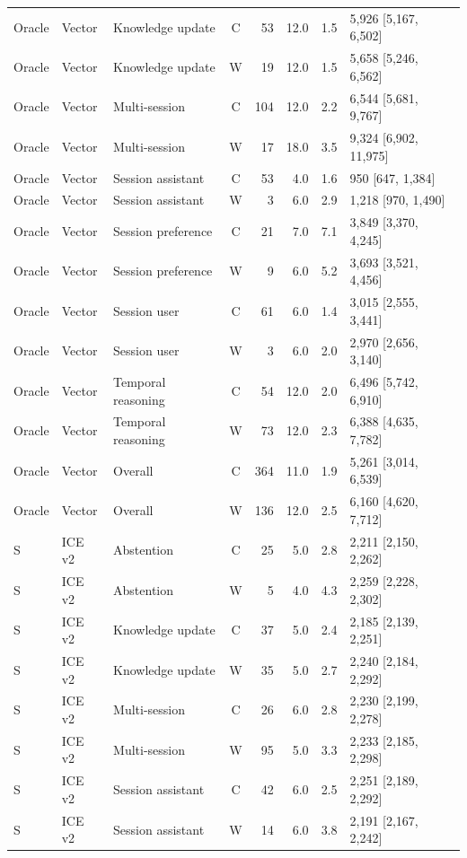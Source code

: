 \documentclass[11pt,a4paper]{article}
\begin{document}
\begin{longtable}{@{}L{1.0cm}L{1.0cm}L{2.6cm}crrrL{3.6cm}@{}}
Oracle & Vector & Knowledge update & C & 53 & 12.0 & 1.5 & 5,926 [5,167, 6,502] \\
Oracle & Vector & Knowledge update & W & 19 & 12.0 & 1.5 & 5,658 [5,246, 6,562] \\
Oracle & Vector & Multi-session & C & 104 & 12.0 & 2.2 & 6,544 [5,681, 9,767] \\
Oracle & Vector & Multi-session & W & 17 & 18.0 & 3.5 & 9,324 [6,902, 11,975] \\
Oracle & Vector & Session assistant & C & 53 & 4.0 & 1.6 & 950 [647, 1,384] \\
Oracle & Vector & Session assistant & W & 3 & 6.0 & 2.9 & 1,218 [970, 1,490] \\
Oracle & Vector & Session preference & C & 21 & 7.0 & 7.1 & 3,849 [3,370, 4,245] \\
Oracle & Vector & Session preference & W & 9 & 6.0 & 5.2 & 3,693 [3,521, 4,456] \\
Oracle & Vector & Session user & C & 61 & 6.0 & 1.4 & 3,015 [2,555, 3,441] \\
Oracle & Vector & Session user & W & 3 & 6.0 & 2.0 & 2,970 [2,656, 3,140] \\
Oracle & Vector & Temporal reasoning & C & 54 & 12.0 & 2.0 & 6,496 [5,742, 6,910] \\
Oracle & Vector & Temporal reasoning & W & 73 & 12.0 & 2.3 & 6,388 [4,635, 7,782] \\
Oracle & Vector & Overall & C & 364 & 11.0 & 1.9 & 5,261 [3,014, 6,539] \\
Oracle & Vector & Overall & W & 136 & 12.0 & 2.5 & 6,160 [4,620, 7,712] \\
S & ICE v2 & Abstention & C & 25 & 5.0 & 2.8 & 2,211 [2,150, 2,262] \\
S & ICE v2 & Abstention & W & 5 & 4.0 & 4.3 & 2,259 [2,228, 2,302] \\
S & ICE v2 & Knowledge update & C & 37 & 5.0 & 2.4 & 2,185 [2,139, 2,251] \\
S & ICE v2 & Knowledge update & W & 35 & 5.0 & 2.7 & 2,240 [2,184, 2,292] \\
S & ICE v2 & Multi-session & C & 26 & 6.0 & 2.8 & 2,230 [2,199, 2,278] \\
S & ICE v2 & Multi-session & W & 95 & 5.0 & 3.3 & 2,233 [2,185, 2,298] \\
S & ICE v2 & Session assistant & C & 42 & 6.0 & 2.5 & 2,251 [2,189, 2,292] \\
S & ICE v2 & Session assistant & W & 14 & 6.0 & 3.8 & 2,191 [2,167, 2,242] \\

\end{longtable}
\end{document}
